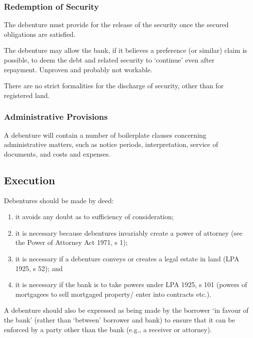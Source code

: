 \documentclass[
]{article}
\providecommand{\tightlist}{%
  \setlength{\itemsep}{0pt}\setlength{\parskip}{0pt}}
\begin{document}
\hypertarget{redemption-of-security}{%
\subsubsection{Redemption of Security}\label{redemption-of-security}}

The debenture must provide for the release of the security once the
secured obligations are satisfied.

The debenture may allow the bank, if it believes a preference (or
similar) claim is possible, to deem the debt and related security to
`continue' even after repayment. Unproven and probably not workable.

There are no strict formalities for the discharge of security, other
than for registered land.

\hypertarget{administrative-provisions}{%
\subsubsection{Administrative
Provisions}\label{administrative-provisions}}

A debenture will contain a number of boilerplate clauses concerning
administrative matters, such as notice periods, interpretation, service
of documents, and costs and expenses.

\hypertarget{execution}{%
\subsection{Execution}\label{execution}}

Debentures should be made by deed:

\begin{enumerate}
\def\labelenumi{\arabic{enumi}.}
\tightlist
\item
  it avoids any doubt as to sufficiency of consideration;
\item
  it is necessary because debentures invariably create a power of
  attorney (see the Power of Attorney Act 1971, s 1);
\item
  it is necessary if a debenture conveys or creates a legal estate in
  land (LPA 1925, s 52); and
\item
  it is necessary if the bank is to take powers under LPA 1925, s 101
  (powers of mortgagees to sell mortgaged property/ enter into contracts
  etc.).
\end{enumerate}

A debenture should also be expressed as being made by the borrower `in
favour of the bank' (rather than `between' borrower and bank) to ensure
that it can be enforced by a party other than the bank (e.g., a receiver
or attorney).
\end{document}
